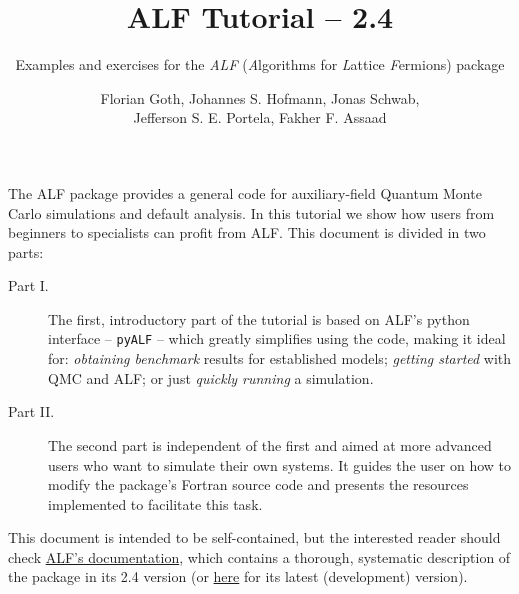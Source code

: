 \documentclass[10pt,modern]{scrartcl}
\numberwithin{exerciseitem}{exercise} %
\newcommand{\ALFver}{2.4}          %
\newcommand{\ALFbranch}{ALF-2.4}   %
\newcommand{\tutALFver}{2.4}       %
\begin{document}
\title{ ALF Tutorial -- \tutALFver{} }
\subtitle{Examples and exercises for the \emph{ALF} (\emph{A}lgorithms for \emph{L}attice \emph{F}ermions) package} %
\author{Florian Goth,  Johannes S. Hofmann,  Jonas Schwab,\\  Jefferson S. E. Portela,  Fakher F. Assaad }
\maketitle



The ALF package provides a general code for auxiliary-field Quantum Monte Carlo simulations and default analysis. In this tutorial we show how users from beginners to specialists can profit from ALF. This document is divided in two parts:
\begin{description}
\item[Part I.] The first, introductory part of the tutorial is based on ALF's python interface -- \texttt{pyALF} -- which greatly simplifies using the code, making it ideal for: \emph{obtaining benchmark} results for established models; \emph{getting started} with QMC and ALF; or just \emph{quickly running} a simulation.
\item[Part II.] The second part is independent of the first and aimed at more advanced users who want to simulate their own systems. It guides the user on how to modify the package's Fortran source code and presents the resources implemented to facilitate this task.
\end{description}

This document is intended to be self-contained, but the interested reader should check \href{https://git.physik.uni-wuerzburg.de/ALF/ALF/-/blob/\ALFbranch/Documentation/doc.pdf}{ALF's documentation}, which contains a thorough, systematic description of the package in its \ALFver{} version (or \href{https://git.physik.uni-wuerzburg.de/ALF/ALF/-/blob/master/Documentation/doc.pdf}{here} for its latest (development) version).
\end{document}
